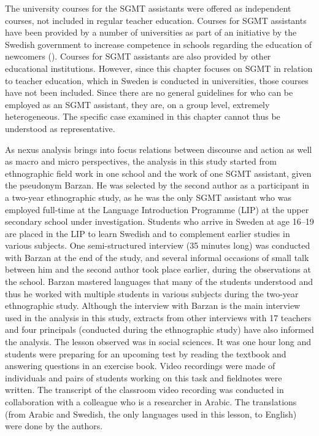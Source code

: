 \documentclass[output=paper]{langscibook}
\begin{document}
The university courses for the SGMT assistants were offered as independent courses, not included in regular teacher education. Courses for SGMT assistants have been provided by a number of universities as part of an initiative by the Swedish government to increase competence in schools regarding the education of newcomers (\citealt{Swedish_ministry_of_education2019}). Courses for SGMT assistants are also provided by other educational institutions. However, since this chapter focuses on SGMT in relation to teacher education, which in Sweden is conducted in universities, those courses have not been included. Since there are no general guidelines for who can be employed as an SGMT assistant, they are, on a group level, extremely heterogeneous. The specific case examined in this chapter cannot thus be understood as representative.

As nexus analysis brings into focus relations between discourse and action as well as macro and micro perspectives, the analysis in this study started from ethnographic field work in one school and the work of one SGMT assistant, given the pseudonym Barzan. He was selected by the second author as a participant in a two-year ethnographic study, as he was the only SGMT assistant who was employed full-time at the Language Introduction Programme (LIP) at the upper secondary school under investigation. Students who arrive in Sweden at age 16--19 are placed in the LIP to learn Swedish and to complement earlier studies in various subjects. One semi-structured interview (35 minutes long) was conducted with Barzan at the end of the study, and several informal occasions of small talk between him and the second author took place earlier, during the observations at the school. Barzan mastered languages that many of the students understood and thus he worked with multiple students in various subjects during the two-year ethnographic study. Although the interview with Barzan is the main interview used in the analysis in this study, extracts from other interviews with 17 teachers and four principals (conducted during the ethnographic study) have also informed the analysis. The lesson observed was in social sciences. It was one hour long and students were preparing for an upcoming test by reading the textbook and answering questions in an exercise book. Video recordings were made of individuals and pairs of students working on this task and fieldnotes were written. The transcript of the classroom video recording was conducted in collaboration with a colleague who is a researcher in Arabic. The translations (from Arabic and Swedish, the only languages used in this lesson, to English) were done by the authors. 
\end{document}
